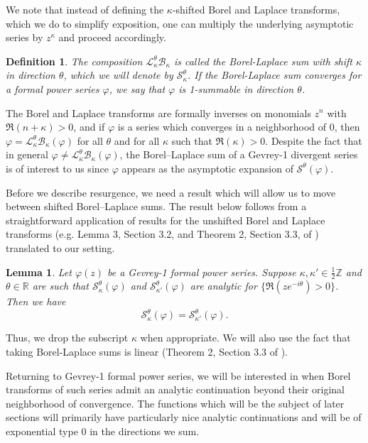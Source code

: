 \documentclass[12pt]{amsart}
\theoremstyle{definition}
\theoremstyle{plain}
\newtheorem{lemma}[theorem]{Lemma}
\newtheorem{definition}[theorem]{Definition}
\numberwithin{equation}{section}
\begin{document}
We note that instead of defining the $\kappa$-shifted Borel and Laplace transforms, which we do to simplify exposition, one can multiply the underlying asymptotic series by $z^{\kappa}$ and proceed accordingly.

\begin{definition}
	The composition $\mathcal{L}_{\kappa}^\theta \mathcal{B}_{\kappa}$ is called the \textit{Borel-Laplace sum} with shift $\kappa$ in direction $\theta$, which we will denote by $\mathcal{S}_\kappa^\theta$.  If the Borel-Laplace sum converges for a formal power series $\varphi$, 
we say that $\varphi$ is 1-summable in direction $\theta$.
\end{definition}
The Borel and Laplace transforms are formally inverses on monomials $z^n$ with $\Re(n+\kappa) > 0$, and if $\varphi$ is a series which converges in a neighborhood of 0, then $\varphi = \mathcal{L}^{\theta}_{\kappa}\mathcal{B}_{\kappa}(\varphi)$ for all $\theta$ and for all $\kappa$ such that $\Re(\kappa) > 0$.
Despite the fact that in general $\varphi \neq \mathcal{L}^{\theta}_{\kappa}\mathcal{B}_{\kappa}(\varphi)$, the Borel--Laplace sum of a Gevrey-1 divergent series is of interest to us since $\varphi$ appears as the asymptotic expansion of $\mathcal{S}^\theta(\varphi).$

Before we describe resurgence, we need a result which will allow us to move between shifted Borel--Laplace sums. The result below follows from a straightforward application of results for the unshifted Borel and Laplace transforms (e.g. Lemma 3, Section 3.2, and Theorem 2, Section 3.3, of \cite{Balser}) translated to our setting.

\begin{lemma} \label{lem: borel laplace shifts} Let $\varphi(z)$ be a Gevrey-1 formal power series. Suppose $\kappa, \kappa' \in \frac{1}{2}\mathbb{Z}$ and $\theta \in \mathbb{R}$ are such that $\mathcal{S}_\kappa^\theta(\varphi)$ and $\mathcal{S}_{\kappa'}^\theta(\varphi)$ are analytic for $\{\Re(ze^{-i\theta})>0\}$. Then we have
	\[\mathcal{S}_\kappa^\theta(\varphi) = \mathcal{S}_{\kappa'}^\theta(\varphi).
	\]
\end{lemma}
Thus, we drop the subscript $\kappa$ when appropriate. We will also use the fact that taking Borel-Laplace sums is linear (Theorem 2, Section 3.3 of \cite{Balser}). 

Returning to Gevrey-1 formal power series, we will be interested in when Borel transforms of such series admit an analytic continuation beyond their original neighborhood of convergence. The functions which will be the subject of later sections will primarily have particularly nice analytic continuations and will be of exponential type 0 in the directions we sum. 
\end{document}

